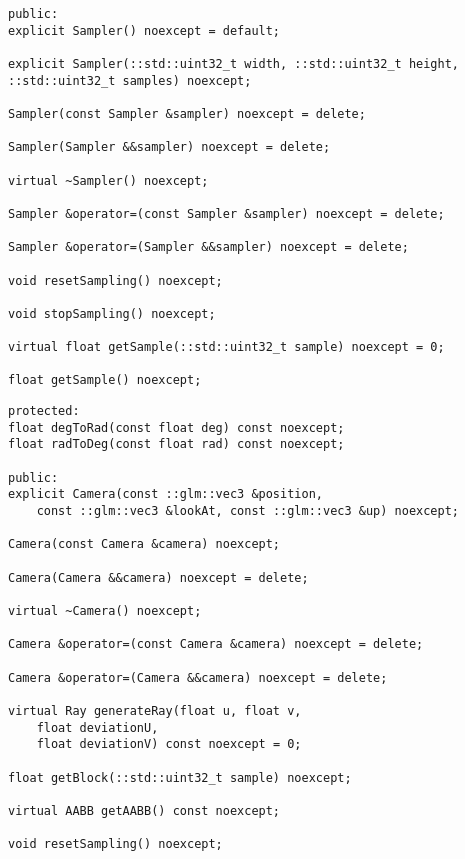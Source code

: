 \begin{lstlisting}[caption={Sampler API}, captionpos=b, label=API_Sampler]
public:
explicit Sampler() noexcept = default;

explicit Sampler(::std::uint32_t width, ::std::uint32_t height,
::std::uint32_t samples) noexcept;

Sampler(const Sampler &sampler) noexcept = delete;

Sampler(Sampler &&sampler) noexcept = delete;

virtual ~Sampler() noexcept;

Sampler &operator=(const Sampler &sampler) noexcept = delete;

Sampler &operator=(Sampler &&sampler) noexcept = delete;

void resetSampling() noexcept;

void stopSampling() noexcept;

virtual float getSample(::std::uint32_t sample) noexcept = 0;

float getSample() noexcept;
\end{lstlisting}

\begin{lstlisting}[caption={Camera API}, captionpos=b, label=API_Camera]
protected:
float degToRad(const float deg) const noexcept;
float radToDeg(const float rad) const noexcept;

public:
explicit Camera(const ::glm::vec3 &position,
	const ::glm::vec3 &lookAt, const ::glm::vec3 &up) noexcept;

Camera(const Camera &camera) noexcept;

Camera(Camera &&camera) noexcept = delete;

virtual ~Camera() noexcept;

Camera &operator=(const Camera &camera) noexcept = delete;

Camera &operator=(Camera &&camera) noexcept = delete;

virtual Ray generateRay(float u, float v,
	float deviationU,
	float deviationV) const noexcept = 0;

float getBlock(::std::uint32_t sample) noexcept;

virtual AABB getAABB() const noexcept;

void resetSampling() noexcept;
\end{lstlisting}


